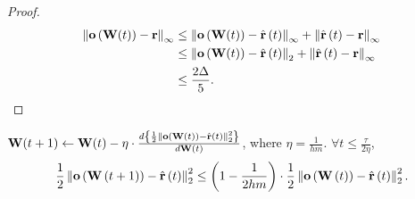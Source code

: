 \begin{proof}
\begin{equation*}
\begin{split}
    \left\| {\mathbf{o}}\left( {\mathbf{W}}(t) \right) - {\mathbf{r}} \right\|_\infty &\le \left\| {\mathbf{o}}\left( {\mathbf{W}}(t) \right) - \hat{{\mathbf{r}}}\left(t\right)\right\|_\infty + \left\| \hat{{\mathbf{r}}}\left(t\right) - {\mathbf{r}}\right\|_\infty \\
    &\le \left\| {\mathbf{o}}\left( {\mathbf{W}}(t) \right) - \hat{{\mathbf{r}}}\left(t\right)\right\|_2 + \left\| \hat{{\mathbf{r}}}\left(t\right) - {\mathbf{r}}\right\|_\infty \\
    &\le \frac{2 \Delta}{5}. \qedhere
\end{split}
\end{equation*}
\end{proof}

\begin{lem}
\label{lem:logit_l2_loss_parameter_smoothness}
${\mathbf{W}}(t+1) \leftarrow {\mathbf{W}}(t) - \eta \cdot \frac{d \left\{ \frac{1}{2} \left\| {\mathbf{o}}\left( {\mathbf{W}}\left(t\right)\right) - \hat{{\mathbf{r}}}\left(t\right) \right\|_2^2 \right\}}{d {\mathbf{W}}(t)}$, where $\eta = \frac{1}{h m}$. $\forall t \le \frac{\tau}{2 \eta}$,
\begin{equation*}
\begin{split}
    \frac{1}{2} \left\| {\mathbf{o}}\left( {\mathbf{W}}\left(t+1\right) \right) - \hat{{\mathbf{r}}}\left(t\right) \right\|_2^2 \le \left( 1 - \frac{1}{2 h m} \right) \cdot \frac{1}{2} \left\| {\mathbf{o}}\left( {\mathbf{W}}\left(t\right) \right) - \hat{{\mathbf{r}}}\left(t\right) \right\|_2^2.
\end{split}
\end{equation*}
\end{lem}
